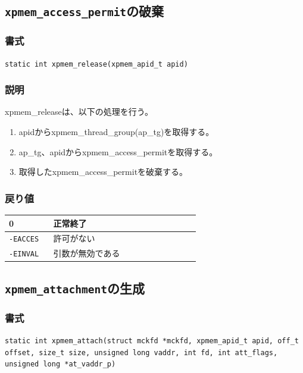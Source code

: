 \documentclass[twoside,11pt,fleqn]{book}
\begin{document}
\subsection{\texttt{xpmem\_access\_permit}の破棄}
\subsubsection*{書式}{\quad}
\texttt{static int xpmem\_release(xpmem\_apid\_t apid)
}

\subsubsection*{説明}{\quad}
xpmem\_releaseは、以下の処理を行う。
\begin{enumerate}
  \item apidからxpmem\_thread\_group(ap\_tg)を取得する。
  \item ap\_tg、apidからxpmem\_access\_permitを取得する。
  \item 取得したxpmem\_access\_permitを破棄する。
\end{enumerate}

\subsubsection*{戻り値}{\quad}
\begin{table}[!h]
\footnotesize
\begin{tabular}{|p{0.20\linewidth}|p{0.66\linewidth}|} \hline
0&正常終了\\ \hline
\texttt{-EACCES}&許可がない\\ \hline
\texttt{-EINVAL}&引数が無効である\\ \hline
\end{tabular}
\vspace{-0em}
\end{table}
\FloatBarrier

\subsection{\texttt{xpmem\_attachment}の生成}
\subsubsection*{書式}{\quad}
\texttt{static int xpmem\_attach(struct mckfd *mckfd,
        xpmem\_apid\_t apid,
        off\_t offset,
        size\_t size,
        unsigned long vaddr,
        int fd,
        int att\_flags,
        unsigned long *at\_vaddr\_p)
}
\end{document}
